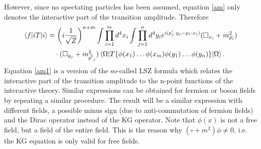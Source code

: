 However, since no spectating particles has been assumed, equation \eqref{am} only denotes the interactive part of the transition amplitude. Therefore
\begin{equation}
	\begin{split}
		\braket{f|iT|i}&=\bigg(i\frac{1}{\sqrt{Z}}\bigg)^{n+m}\int\prod_{i=1}^m d^4x_i\int\prod_{j=1}^n d^4y_ie^{i(p'_j\cdot y_j-p_i\cdot x_i)}(\square _{x_i}+m_{\vec{p}_i}^2)\\
		&\quad\cdot(\square _{y_j}+m_{\vec{p'}_j}^2)\braket{\Omega|T\{\phi(x_1)\dots\phi(x_m)\phi(y_1)\dots \phi(y_n)\}|\Omega}.\\
	\end{split}
	\label{am1}
\end{equation} 
Equation \eqref{am1} is a version of the so-called LSZ formula which relates the interactive part of the transition amplitude to the n-point functions of the interactive theory. Similar expressions can be obtained for fermion or boson fields by repeating a similar procedure. The result will be a similar expression with different fields, a possible minus sign (due to anti-commutation of fermion fields) and the Dirac operator instead of the KG operator. Note that $\phi(x)$ is not a free field, but a field of the entire field. This is the reason why $(\square +m^2)\phi\neq0$, i.e. the KG equation is only valid for free fields. 

